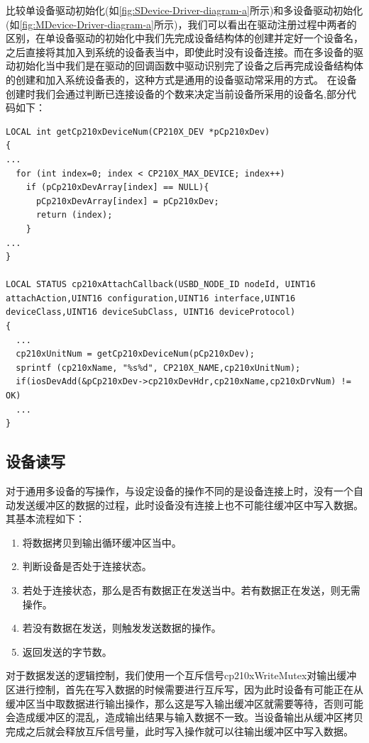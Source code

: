 	比较单设备驱动初始化(如\autoref{fig:SDevice-Driver-diagram-a}所示)和多设备驱动初始化(如\autoref{fig:MDevice-Driver-diagram-a}所示)，我们可以看出在驱动注册过程中两者的区别，在单设备驱动的初始化中我们先完成设备结构体的创建并定好一个设备名，之后直接将其加入到系统的设备表当中，即使此时没有设备连接。而在多设备的驱动初始化当中我们是在驱动的回调函数中驱动识别完了设备之后再完成设备结构体的创建和加入系统设备表的，这种方式是通用的设备驱动常采用的方式。
	在设备创建时我们会通过判断已连接设备的个数来决定当前设备所采用的设备名,部分代码如下：

\lstset{language=C}
\begin{lstlisting}
LOCAL int getCp210xDeviceNum(CP210X_DEV *pCp210xDev)
{
...
  for (int index=0; index < CP210X_MAX_DEVICE; index++)
    if (pCp210xDevArray[index] == NULL){
      pCp210xDevArray[index] = pCp210xDev;
      return (index);
    }
...
}
	
LOCAL STATUS cp210xAttachCallback(USBD_NODE_ID nodeId, UINT16 attachAction,UINT16 configuration,UINT16 interface,UINT16 deviceClass,UINT16 deviceSubClass, UINT16 deviceProtocol)
{
  ...
  cp210xUnitNum = getCp210xDeviceNum(pCp210xDev);
  sprintf (cp210xName, "%s%d", CP210X_NAME,cp210xUnitNum);
  if(iosDevAdd(&pCp210xDev->cp210xDevHdr,cp210xName,cp210xDrvNum) != OK)
  ...
}
\end{lstlisting}


\subsection{设备读写}
	
		
	对于通用多设备的写操作，与设定设备的操作不同的是设备连接上时，没有一个自动发送缓冲区的数据的过程，此时设备没有连接上也不可能往缓冲区中写入数据。其基本流程如下：	
	
	\begin{enumerate}
	\item 将数据拷贝到输出循环缓冲区当中。
	\item 判断设备是否处于连接状态。
	\item 若处于连接状态，那么是否有数据正在发送当中。若有数据正在发送，则无需操作。
	\item 若没有数据在发送，则触发发送数据的操作。
	\item 返回发送的字节数。
	\end{enumerate}
	
	
	对于数据发送的逻辑控制，我们使用一个互斥信号cp210xWriteMutex对输出缓冲区进行控制，首先在写入数据的时候需要进行互斥写，因为此时设备有可能正在从缓冲区当中取数据进行输出操作，那么这是写入输出缓冲区就需要等待，否则可能会造成缓冲区的混乱，造成输出结果与输入数据不一致。当设备输出从缓冲区拷贝完成之后就会释放互斥信号量，此时写入操作就可以往输出缓冲区中写入数据。
	

